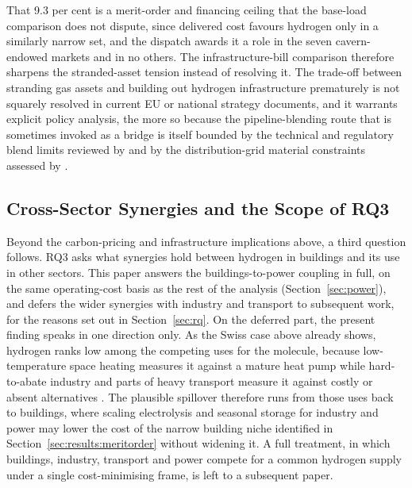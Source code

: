 That 9.3 per cent is a merit-order and financing ceiling that the base-load comparison does not dispute, since delivered cost favours hydrogen only in a similarly narrow set, and the dispatch awards it a role in the seven cavern-endowed markets and in no
others. The infrastructure-bill comparison therefore sharpens the stranded-asset tension
instead of resolving it. The trade-off between stranding gas assets and building out
hydrogen infrastructure prematurely is not squarely resolved in current EU or national
strategy documents, and it warrants explicit policy analysis, the more so because the
pipeline-blending route that is sometimes invoked as a bridge is itself bounded by the
technical and regulatory blend limits reviewed by \citet{Erdener2022Review} and by the
distribution-grid material constraints assessed by \citet{Giehl2023}.

\subsection{Cross-Sector Synergies and the Scope of RQ3} \label{sec:discussion:rq3}

Beyond the carbon-pricing and infrastructure implications above, a third question
follows. RQ3 asks what synergies hold between hydrogen in buildings and its use in
other sectors. This paper answers the buildings-to-power coupling in full, on the same
operating-cost basis as the rest of the analysis (Section~\ref{sec:power}), and
defers the wider synergies with industry and transport to subsequent work, for the
reasons set out in Section~\ref{sec:rq}. On the deferred part, the present finding
speaks in one direction only. As the Swiss case above already shows, hydrogen ranks low
among the competing uses for the molecule, because low-temperature space heating
measures it against a mature heat pump while hard-to-abate industry and parts of heavy
transport measure it against costly or absent alternatives
\citep{Quarton2019Curious, Brown2018Synergies}. The plausible spillover therefore runs from those uses back to buildings, where
scaling electrolysis and seasonal storage for industry and power may lower the
cost of the narrow building niche identified in
Section~\ref{sec:results:meritorder} without widening it. A full treatment, in
which buildings, industry, transport and power compete for a common hydrogen
supply under a single cost-minimising frame, is left to a subsequent paper.

